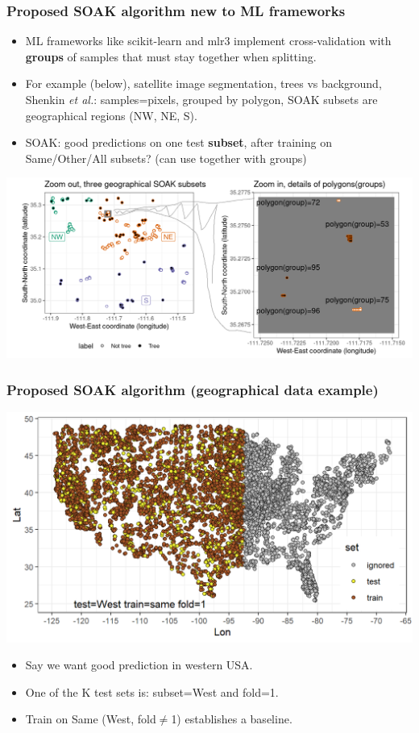 \documentclass[t]{beamer}
\begin{document}
\begin{frame}
  \frametitle{Proposed SOAK algorithm new to ML frameworks}
  \small
  \begin{itemize}
  \item ML frameworks like scikit-learn and mlr3 implement cross-validation with \textbf{groups} of samples that must stay together when splitting.
  \item For example (below), satellite image segmentation, trees vs background, Shenkin \emph{et al.}: samples=pixels, grouped by polygon, SOAK subsets are geographical regions (NW, NE, S).
  \item SOAK: good predictions on one test \textbf{subset},
    after training on Same/Other/All subsets? (can use together with groups)
  \end{itemize}
  \includegraphics[width=\textwidth]{figure-aztrees}
\end{frame}

\begin{frame}
  \frametitle{Proposed SOAK algorithm (geographical data example)}
  \includegraphics[width=\textwidth]{figure-proda-cv-map-West-same}

  \begin{itemize}
  \item Say we want good prediction in western USA.
  \item One of the K test sets is: subset=West and fold=1.
  \item Train on Same (West, fold$\neq$1) establishes a baseline.
  \end{itemize}
\end{frame}
\end{document}
